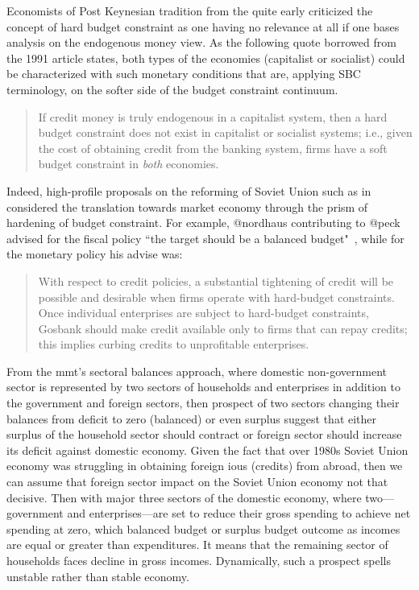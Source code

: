 Economists of Post Keynesian tradition from the quite early criticized
the concept of hard budget constraint as one having no relevance at all
if one bases analysis on the endogenous money view. As the following
quote borrowed from the 1991 article states, both types of the economies
(capitalist or socialist) could be characterized with such monetary
conditions that are, applying SBC terminology, on the softer side of the
budget constraint continuum.

\begin{quote}
 If credit money is truly endogenous in a capitalist system, then a
 hard budget constraint does not exist in capitalist or socialist
 systems; i.e., given the cost of obtaining credit from the banking
 system, firms have a soft budget constraint in \textit{both} economies.
 \citep[p.~330, emphasis added]{szego}
\end{quote}

Indeed, high-profile proposals on the reforming of Soviet Union such as
in \citep{peck} considered the translation towards market economy through the
prism of hardening of budget constraint. For example, @nordhaus
contributing to @peck advised for the fiscal policy ``the target should
be a balanced budget"~\citep[p.~104]{nordhaus}, while for the monetary policy
his advise was:

\begin{quote}
 With respect to credit policies, a substantial tightening of credit
 will be possible and desirable when firms operate with hard-budget
 constraints. Once individual enterprises are subject to hard-budget
 constraints, Gosbank should make credit available only to firms that
 can repay credits; this implies curbing credits to unprofitable
 enterprises.~\citep[p.~108]{nordhaus}
\end{quote}

From the \ac{mmt}'s sectoral balances approach, where domestic non-government
sector is represented by two sectors of households and enterprises in
addition to the government and foreign sectors, then prospect of two
sectors changing their balances from deficit to zero (balanced) or even
surplus suggest that either surplus of the household sector should
contract or foreign sector should increase its deficit against domestic
economy. Given the fact that over 1980s Soviet Union economy was
struggling in obtaining foreign \acp{iou} (credits) from abroad, then we can
assume that foreign sector impact on the Soviet Union economy not that
decisive. Then with major three sectors of the domestic economy, where
two---government and enterprises---are set to reduce their gross
spending to achieve net spending at zero, which balanced budget or
surplus budget outcome as incomes are equal or greater than
expenditures. It means that the remaining sector of households faces
decline in gross incomes. Dynamically, such a prospect spells unstable
rather than stable economy.

